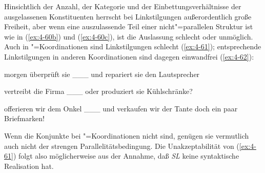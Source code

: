 \documentclass[output=paper]{langsci/langscibook}
\begin{document}
\begin{exe}
\ex
\label{ex:4-60}
\begin{xlist}


\end{xlist}
\end{exe}
Hinsichtlich der Anzahl, der Kategorie und der Einbettungsverhältnisse der ausgelassenen Konstituenten herrscht bei Linkstilgungen außerordentlich große Freiheit, aber wenn eine auszulassende  Teil einer nicht"=parallelen Struktur ist wie in (\ref{ex:4-60b}) und (\ref{ex:4-60c}), ist die Auslassung schlecht oder unmöglich. Auch in "=Koordinationen sind Linkstilgungen schlecht (\ref{ex:4-61}); entsprechende Linkstilgungen in anderen Koordinationen sind dagegen einwandfrei (\ref{ex:4-62}):

\begin{exe}
\ex
\label{ex:4-61}
\begin{xlist}



\end{xlist}
\ex
\label{ex:4-62}
\begin{xlist}
\ex%
\label{ex:4-62a}
morgen überprüft sie \_\_\_ und repariert sie den Lautsprecher

\ex%
\label{ex:4-62b}
vertreibt die Firma \_\_\_ oder produziert sie Kühlschränke?

\ex%
\label{ex:4-62c}
offerieren wir dem Onkel \_\_\_ und verkaufen wir der Tante doch ein paar Briefmarken!
\end{xlist}
\end{exe}
Wenn die Konjunkte bei "=Koordinationen nicht  sind, genügen sie vermutlich auch nicht der strengen Parallelitätsbedingung. Die Unakzeptabilität von (\ref{ex:4-61}) folgt also möglicherweise aus der Annahme, daß \textit{SL} keine syntaktische Realisation hat.
\end{document}
